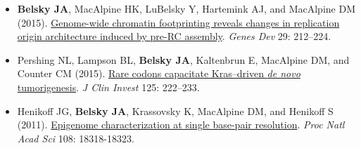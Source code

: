 
\vspace{-2mm}
\begin{resentries}

\begin{itemize}[leftmargin=!, labelindent=5pt, itemindent=-15pt, itemsep=-1.5mm]
	\item{\textbf{Belsky JA}, MacAlpine HK, LuBelsky Y, Hartemink AJ, and MacAlpine DM (2015).  \href{http://dx.doi.org/10.1101/gad.247924.114}{\color{blue} Genome-wide chromatin footprinting reveals changes in replication origin architecture induced by pre-RC assembly}.  \textit{Genes Dev} 29: 212--224.}
	\item{Pershing NL, Lampson BL, \textbf{Belsky JA}, Kaltenbrun E, MacAlpine DM, and Counter CM (2015).  \href{http://dx.doi.org/10.1172/JCI77627}{\color{blue} Rare codons capacitate Kras--driven \textit{de novo} tumorigenesis}.  \textit{J Clin Invest} 125: 222--233.}
	\item{Henikoff JG, \textbf{Belsky JA}, Krassovsky K, MacAlpine DM, and Henikoff S (2011).  \href{http://dx.doi.org/10.1073/pnas.1110731108}{\color{blue} Epigenome characterization at single base-pair resolution}.  \textit{Proc Natl Acad Sci} 108: 18318-18323.}

\end{itemize}

\end{resentries}
